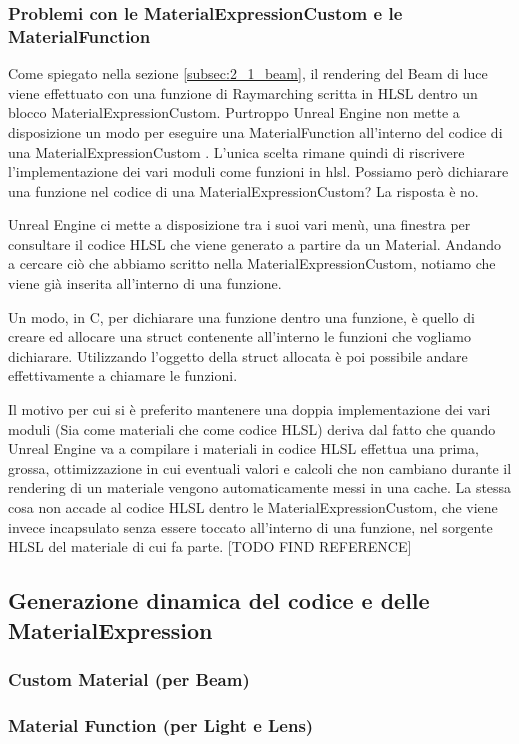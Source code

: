 \documentclass[main.tex]{subfiles}
\begin{document}
\subsubsection{Problemi con le MaterialExpressionCustom e le MaterialFunction}\label{subsec:2_2_CM-MFproblems}
Come spiegato nella sezione \ref{subsec:2_1_beam}, il rendering del Beam di luce viene effettuato con una funzione di Raymarching scritta in HLSL dentro un blocco MaterialExpressionCustom. Purtroppo Unreal Engine non mette a disposizione un modo  per eseguire una MaterialFunction all'interno del codice di una MaterialExpressionCustom \cite{customExpressionMaterialFunction}. L'unica scelta rimane quindi di riscrivere l'implementazione dei vari moduli come funzioni in hlsl. Possiamo però dichiarare una funzione nel codice di una MaterialExpressionCustom? La risposta è no.

Unreal Engine ci mette a disposizione tra i suoi vari menù, una finestra per consultare il codice HLSL che viene generato a partire da un Material. Andando a cercare ciò che abbiamo scritto nella MaterialExpressionCustom, notiamo che viene già inserita all'interno di una funzione.

Un modo, in C, per dichiarare una funzione dentro una funzione, è quello di creare ed allocare una struct contenente all'interno le funzioni che vogliamo dichiarare. Utilizzando l'oggetto della struct allocata è poi possibile andare effettivamente a chiamare le funzioni.

Il motivo per cui si è preferito mantenere una doppia implementazione dei vari moduli (Sia come materiali che come codice HLSL) deriva dal fatto che quando Unreal Engine va a compilare i materiali in codice HLSL effettua una prima, grossa, ottimizzazione in cui eventuali valori e calcoli che non cambiano durante il rendering di un materiale vengono automaticamente messi in una cache. La stessa cosa non accade al codice HLSL dentro le MaterialExpressionCustom, che viene invece incapsulato senza essere toccato all'interno di una funzione, nel sorgente HLSL del materiale di cui fa parte. [TODO FIND REFERENCE]

\subsection{Generazione dinamica del codice e delle MaterialExpression}\label{subsec:2_codeGeneration}
\subsubsection{Custom Material (per Beam)}\label{subsec:2_3_CM}
\subsubsection{Material Function (per Light e Lens)}\label{subsec:2_3_MF}
\end{document}
